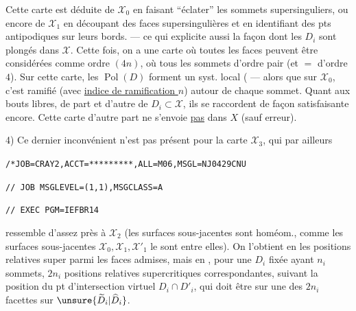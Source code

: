 Cette carte  est déduite de $\mathcal X_0$ en faisant ``éclater'' les  sommets supersinguliers, ou encore de $\mathcal X_1$ en découpant  des faces supersingulières et en identifiant des pts antipodiques sur leurs bords. --- ce qui explicite aussi la façon dont les $D_i$ sont plongés dans $\mathcal X$. Cette fois, on a une carte où toutes les faces peuvent être considérées comme  ordre  $(4n)$, où tous les sommets d'ordre pair (et $=$ d'ordre $4$). Sur cette carte, les $\operatorname{Pol}(D)$ forment un syst. local ( --- alors que sur $\mathcal X_0$, c'est ramifié (avec \uline{indice de ramification $n$}) autour de chaque sommet. Quant aux bouts libres, de part et d'autre de $D_i\subset\mathcal X$, ils se raccordent de façon satisfaisante encore. Cette carte d'autre part ne s'envoie \uline{pas} dans $X$ (sauf erreur).


4) Ce dernier inconvénient n'est pas présent pour la carte $\mathcal X_3$, qui  par ailleurs

\texttt{/*JOB=CRAY2,ACCT=*********,ALL=M06,MSGL=N}\qquad\texttt{J0429CNU}

\texttt{// JOB MSGLEVEL=(1,1),MSGCLASS=A}

\texttt{// EXEC PGM=IEFBR14}


ressemble d'assez près à $\mathcal X_2$ (les surfaces sous-jacentes sont homéom.,  comme les surfaces sous-jacentes $\mathcal X_0,\mathcal X_1,\mathcal X'_1$ le sont entre elles). On l'obtient en  les positions relatives super parmi les faces admises, mais en , pour une $D_i$ fixée ayant $n_i$ sommets, $2n_i$ positions relatives supercritiques  correspondantes, suivant la position du pt d'intersection virtuel $D_i\cap D'_i$, qui doit être sur une des $2n_i$ facettes sur $\unsure{\widetilde D_i|\widehat D_i}$.

